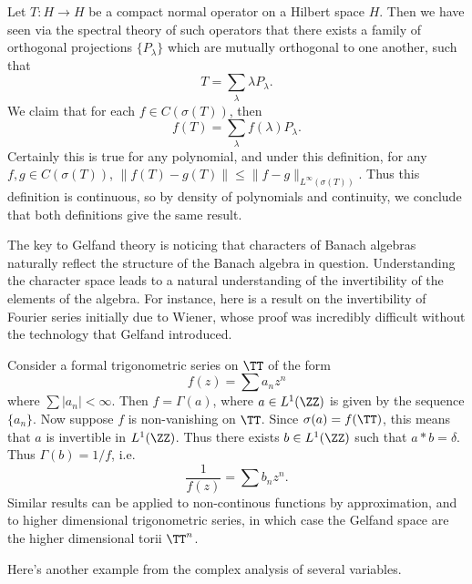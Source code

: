 \begin{example}
    Let $T: H \to H$ be a compact normal operator on a Hilbert space $H$. Then we have seen via the spectral theory of such operators that there exists a family of orthogonal projections $\{ P_\lambda \}$ which are mutually orthogonal to one another, such that
    \[ T = \sum_\lambda \lambda P_\lambda. \]
    We claim that for each $f \in C(\sigma(T))$, then
    \[ f(T) = \sum_\lambda f(\lambda) P_\lambda. \]
    Certainly this is true for any polynomial, and under this definition, for any $f,g \in C(\sigma(T))$, $\| f(T) - g(T) \| \leq \| f - g \|_{L^\infty(\sigma(T))}$. Thus this definition is continuous, so by density of polynomials and continuity, we conclude that both definitions give the same result.
\end{example}

The key to Gelfand theory is noticing that characters of Banach algebras naturally reflect the structure of the Banach algebra in question. Understanding the character space leads to a natural understanding of the invertibility of the elements of the algebra. For instance, here is a result on the invertibility of Fourier series initially due to Wiener, whose proof was incredibly difficult without the technology that Gelfand introduced.

\begin{example}
    Consider a formal trigonometric series on $\TT$ of the form
    \[ f(z) = \sum a_n z^n \]
    where $\sum |a_n| < \infty$. Then $f = \Gamma(a)$, where $a \in L^1(\ZZ)$ is given by the sequence $\{ a_n \}$. Now suppose $f$ is non-vanishing on $\TT$. Since $\sigma(a) = f(\TT)$, this means that $a$ is invertible in $L^1(\ZZ)$. Thus there exists $b \in L^1(\ZZ)$ such that $a * b = \delta$. Thus $\Gamma(b) = 1/f$, i.e.
    \[ \frac{1}{f(z)} = \sum b_n z^n. \]
    Similar results can be applied to non-continous functions by approximation, and to higher dimensional trigonometric series, in which case the Gelfand space are the higher dimensional torii $\TT^n$.
\end{example}

Here's another example from the complex analysis of several variables.

